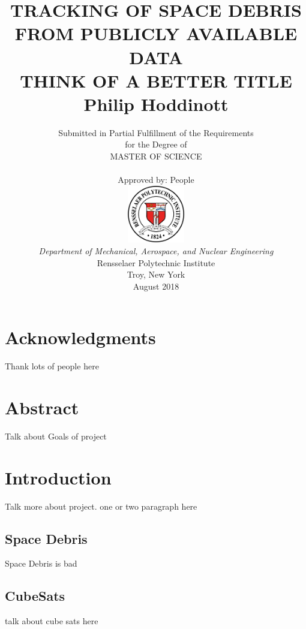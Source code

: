\documentclass[12pt]{report}
\title{ 
		\LARGE \textbf{\uppercase{Tracking of space debris from publicly available data\\ Think of a better title}} \\
		\vspace{0.25cm}
		\LARGE \textbf{Philip Hoddinott}
	}
\author{\small{Submitted in Partial Fulfillment of the Requirements} \\ \small{for the Degree of} \\
		\uppercase{Master of Science} \\ \\
		Approved by: People\\
		\includegraphics[width=2.5cm]{rensselaer_seal.png} \\
		\small{\textit{Department of Mechanical, Aerospace, and Nuclear Engineering}} \\
		\small{Rensselaer Polytechnic Institute} \\ 
		\small{Troy, New York} \\
		\small{August 2018}
	}
\begin{document}
	\maketitle
	
	\setcounter{page}{2}
	\tableofcontents
	\listoftables
	\listoffigures
	
	\newpage
	\section{Acknowledgments}
	
	
	Thank lots of people here
	

	
	
	\newpage
	\section{Abstract}

	Talk about Goals of project
	\newpage
	\section{Introduction}
	
	Talk more about project. one or two paragraph here 

	\subsection{Space Debris}
	Space Debris is bad
	\subsection{CubeSats}
	talk about cube sats here
	
\end{document}
